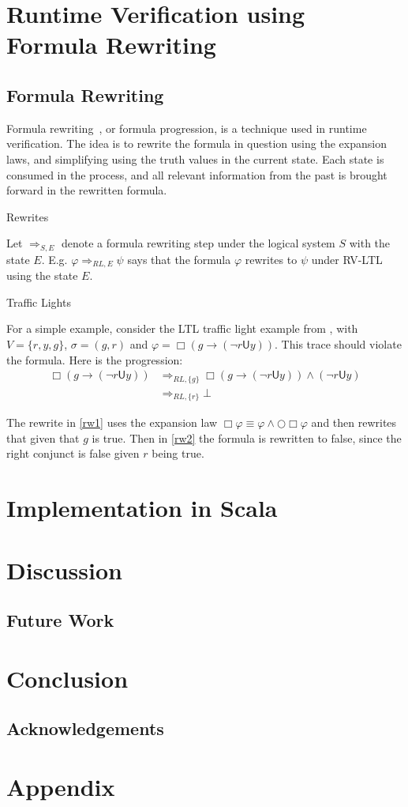 \documentclass[a4paper]{article}
\newcommand{\U}{\mathsf{U}}
\newcommand{\rw}[1]{\Rightarrow_{#1}}
\begin{document}

\section{Runtime Verification using Formula Rewriting}
\subsection{Formula Rewriting}
Formula rewriting~\autocite{rosu2005rewriting}, or formula progression, is a technique used in runtime verification.
The idea is to rewrite the formula in question using the expansion laws, and simplifying using the truth values in the current state.
Each state is consumed in the process, and all relevant information from the past is brought forward in the rewritten formula.

\begin{notn}{Rewrites}

Let $\rw{S,E}$ denote a formula rewriting step under the logical system $S$ with the state $E$. E.g. $\varphi\rw{RL,E}\psi$ says that the formula $\varphi$ rewrites to $\psi$ under RV-LTL using the state $E$.
\end{notn}

\begin{eg}{Traffic Lights}

For a simple example, consider the LTL traffic light example from \textcite[175]{rosu2005rewriting}, with $V=\{r,y,g\}$, $\sigma = ({g},{r})$ and $\varphi = \Box (g \to (\neg r \U y))$. This trace should violate the formula. Here is the progression:
\begin{align}
  \Box (g \to (\neg r \U y)) &\rw{RL,\{g\}} \Box (g \to (\neg r \U y)) \land (\neg r \U y)\label{rw1}\\
  &\rw{RL,\{r\}} \bot\label{rw2}
\end{align}

The rewrite in \eqref{rw1} uses the expansion law $\Box \varphi \equiv \varphi \land \bigcirc \Box \varphi$ and then rewrites that given that $g$ is true.
Then in \eqref{rw2} the formula is rewritten to false, since the right conjunct is false given $r$ being true.
\end{eg}

\section{Implementation in Scala}

\section{Discussion}
\subsection{Future Work}
\section{Conclusion}
\subsection{Acknowledgements}

\nocite{*}
\printbibliography{}
\newpage
\section{Appendix}\label{appendix}
\end{document}
